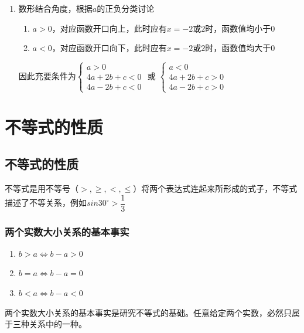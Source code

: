 \begin{enumerate}
\begin{jieda}
\begin{enumerate}
\begin{dingautolist}{172}
                因此充要条件为$\left \{\begin{array}{l}
                     -\dfrac{b}{2a} > 0 \\
                     c = 0
                \end{array} \right.$
            \end{dingautolist}
            \item 数形结合角度，根据$a$的正负分类讨论
                \begin{enumerate}
                    \item $a > 0$，对应函数开口向上，此时应有$x = -2 \mbox{或} 2$时，函数值均小于0
                    \item $a < 0$，对应函数开口向下，此时应有$x = -2 \mbox{或} 2$时，函数值均大于0
                \end{enumerate}
                因此充要条件为$\left \{ 
                    \begin{array}{l}
                         a > 0 \\
                         4a+2b+c < 0 \\
                         4a-2b+c < 0 
                    \end{array}
                \right.$ 或
                $\left \{ 
                    \begin{array}{l}
                         a < 0 \\
                         4a+2b+c > 0 \\
                         4a-2b+c > 0 
                    \end{array}
                \right.$
        \end{enumerate}
    \end{jieda}
\end{enumerate}
\section*{不等式的性质}
\subsection*{不等式的性质}
不等式是用不等号（$>, \geq, <, \leq$）将两个表达式连起来所形成的式子，不等式描述了不等关系，例如$sin30^{\circ} > \dfrac{1}{3}$
\subsubsection*{两个实数大小关系的基本事实}
\begin{enumerate}
    \item $b > a \Longleftrightarrow b - a > 0$
    \item $b = a \Longleftrightarrow b - a = 0$
    \item $b < a \Longleftrightarrow b - a < 0$
\end{enumerate}
两个实数大小关系的基本事实是研究不等式的基础。任意给定两个实数，必然只属于三种关系中的一种。
